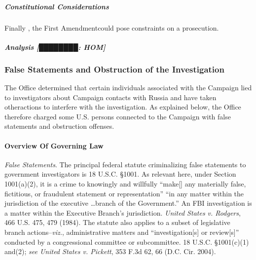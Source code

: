 \subparagraph{Constitutional Considerations}
Finally , the First Amendmentcould pose constraints on a prosecution. 

\subparagraph{Analysis [████████: HOM]}



\subsubsection{False Statements and Obstruction of the Investigation}
The Office determined that certain individuals associated with the Campaign lied to investigators about Campaign contacts with Russia and have taken otheractions to interfere with the investigation. 
As explained below, the Office therefore charged some U.S. persons connected to the Campaign with false statements and obstruction offenses.

\paragraph{Overview Of Governing Law}
\textit{False Statements}. 
The principal federal statute criminalizing false statements to government investigators is 18 U.S.C. \S 1001.
As relevant here, under Section 1001(a)(2), it is a crime to knowingly and willfully ``make[] any materially false, fictitious, or fraudulent statement or representation'' ``in any matter within the jurisdiction of the executive \dots branch of the Government.''
An FBI investigation is a matter within the Executive Branch's jurisdiction. 
\textit{United States v. Rodgers}, 466 U.S. 475, 479 (1984). 
The statute also applies to a subset of legislative branch actions--\textit{viz.}, administrative matters and ``investigation[s] or review[s]'' conducted by a congressional committee or subcommittee. 
18 U.S.C. \S 1001(c)(1) and(2); \textit{see United States v. Pickett}, 353 F.3d 62, 66 (D.C. Cir. 2004). 

